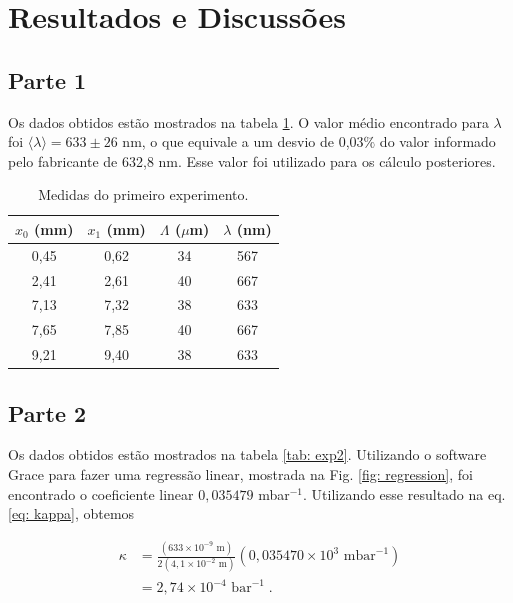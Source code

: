 \section{Resultados e Discussões}

\subsection*{Parte 1}

Os dados obtidos estão mostrados na tabela \ref{tab: exp1}. 
O valor médio encontrado para $\lambda$ foi $\langle \lambda \rangle = 633 \pm 26  \text{ nm} $, o que equivale a um desvio de 0,03$\%$ do valor informado pelo fabricante de 632,8 nm. 
Esse valor foi utilizado para os cálculo posteriores.

\begin{table}[h]
\centering
\caption{Medidas do primeiro experimento.}
\begin{tabular}{c|c|c|c}
\toprule\midrule
$x_0$ (mm)& $x_1$ (mm) & $\Lambda$ ($\mu$m) & $\lambda$ (nm) \\
\midrule
0,45 & 0,62 & 34 & 567 \\
2,41 & 2,61 & 40 & 667 \\
7,13 & 7,32 & 38 & 633 \\
7,65 & 7,85 & 40 & 667 \\
9,21 & 9,40 & 38 & 633 \\
\midrule\bottomrule
\end{tabular}
\label{tab: exp1}
\end{table}

\subsection*{Parte 2}

Os dados obtidos estão mostrados na tabela \ref{tab: exp2}. Utilizando o software Grace para fazer uma regressão linear, mostrada na Fig. \ref{fig: regression}, foi encontrado o coeficiente linear $0,035479$ mbar$^{-1}$. Utilizando esse resultado na eq. \eqref{eq: kappa}, obtemos

\begin{equation*}
\begin{aligned}
\kappa &= \frac{(633 \times 10^{-9} \text{ m})}{2(4,1 \times 10^{-2} \text{ m})} (0,035470 \times 10^{3} \text{ mbar}^{-1}) \\ 
&= 2,74 \times 10^{-4} \text{ bar}^{-1}\;.
\end{aligned}
\end{equation*}

